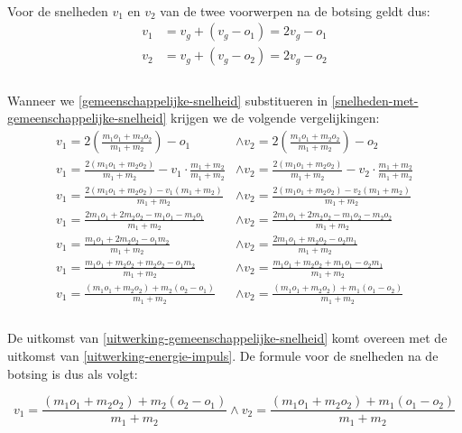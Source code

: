 \documentclass[12pt,a4paper]{article}
\begin{document}
	\\Voor de snelheden $v_1$ en $v_2$ van de twee voorwerpen na de botsing geldt dus:
	\begin{equation}
		\begin{aligned}
		\label{snelheden-met-gemeenschappelijke-snelheid}
			v_1&=v_g+(v_g-o_1)=2v_g-o_1\\
			v_2&=v_g+(v_g-o_2)=2v_g-o_2\\
		\end{aligned}
	\end{equation}
	\\Wanneer we \eqref{gemeenschappelijke-snelheid} substitueren in \eqref{snelheden-met-gemeenschappelijke-snelheid} krijgen we de volgende vergelijkingen:
	\begin{equation}
		\begin{aligned}
		\label{uitwerking-gemeenschappelijke-snelheid}
			v_1=2\left(\frac{m_1o_1+m_2o_2}{m_1+m_2}\right)-o_1 &\wedge v_2=2\left(\frac{m_1o_1+m_2o_2}{m_1+m_2}\right)-o_2\\
			v_1=\frac{2\left(m_1o_1+m_2o_2\right)}{m_1+m_2}-v_1\cdot\frac{m_1+m_2}{m_1+m_2} &\wedge v_2=\frac{2\left(m_1o_1+m_2o_2\right)}{m_1+m_2}-v_2\cdot\frac{m_1+m_2}{m_1+m_2}\\
			v_1=\frac{2\left(m_1o_1+m_2o_2\right)-v_1\left(m_1+m_2\right)}{m_1+m_2} &\wedge v_2=\frac{2\left(m_1o_1+m_2o_2\right)-v_2\left(m_1+m_2\right)}{m_1+m_2}\\
			v_1=\frac{2m_1o_1+2m_2o_2-m_1o_1-m_2o_1}{m_1+m_2} &\wedge v_2=\frac{2m_1o_1+2m_2o_2-m_1o_2-m_2o_2}{m_1+m_2}\\
			v_1=\frac{m_1o_1+2m_2o_2-o_1m_2}{m_1+m_2} &\wedge v_2=\frac{2m_1o_1+m_2o_2-o_2m_1}{m_1+m_2}\\
			v_1=\frac{m_1o_1+m_2o_2+m_2o_2-o_1m_2}{m_1+m_2} &\wedge v_2=\frac{m_1o_1+m_2o_2+m_1o_1-o_2m_1}{m_1+m_2}\\
			v_1=\frac{\left(m_1o_1+m_2o_2\right)+m_2\left(o_2-o_1\right)}{m_1+m_2} &\wedge v_2=\frac{\left(m_1o_1+m_2o_2\right)+m_1\left(o_1-o_2\right)}{m_1+m_2}\\
		\end{aligned}
	\end{equation}
	\\De uitkomst van \eqref{uitwerking-gemeenschappelijke-snelheid} komt overeen met de uitkomst van \eqref{uitwerking-energie-impuls}. De formule voor de snelheden na de botsing is dus als volgt:

	\begin{equation}
		\label{snelheden-na-botsing}
			\boxed{v_1=\frac{\left(m_1o_1+m_2o_2\right)+m_2\left(o_2-o_1\right)}{m_1+m_2} \wedge v_2=\frac{\left(m_1o_1+m_2o_2\right)+m_1\left(o_1-o_2\right)}{m_1+m_2}}
	\end{equation}
\end{document}

